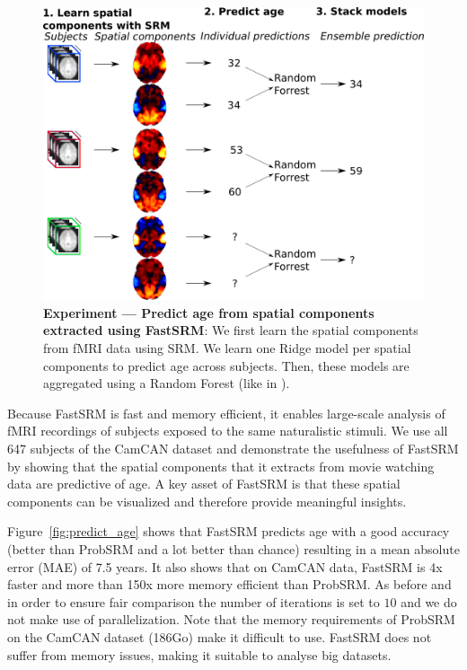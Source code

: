 \begin{figure}
\centering
\includegraphics[scale=0.35]{figures/srm/conceptual_figure72.png}
\caption{\textbf{Experiment — Predict age from spatial components extracted using FastSRM}: We first learn the spatial components from fMRI data using SRM. We learn one Ridge model per spatial components to predict age across subjects. Then, these models are aggregated using a Random Forest (like in \cite{rahim2017joint}).} 
\label{fig:experiment_age_prediction}
\end{figure}


Because FastSRM is fast and memory efficient, it enables large-scale analysis of fMRI recordings of subjects exposed to the same naturalistic stimuli.
%
We use all 647 subjects of the CamCAN dataset and demonstrate the usefulness of FastSRM by showing that the spatial components that it extracts from movie watching data are predictive of age.
%
A key asset of FastSRM is that these spatial components can be visualized and therefore provide meaningful insights. 

Figure~\ref{fig:predict_age} shows that FastSRM predicts age with a good accuracy (better than ProbSRM and a lot better than chance) resulting in a mean absolute error (MAE) of 7.5 years.
%
It also shows that on CamCAN data, FastSRM is 4x faster and more than 150x more memory efficient than ProbSRM. As before and in order to ensure fair comparison the number of iterations is set to $10$ and we do not make use of parallelization. Note that the memory requirements of ProbSRM on the CamCAN dataset (186Go) make it difficult to use.
%
FastSRM does not suffer from memory issues, making it suitable to analyse big datasets.

